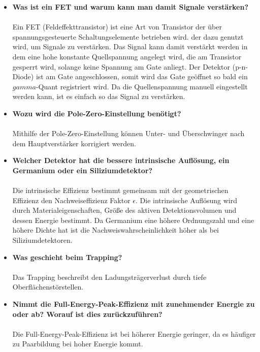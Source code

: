\documentclass{article}
\begin{document}
\begin{itemize}
	\item \textbf{Was ist ein FET und warum kann man damit Signale verstärken?}\\\\
	Ein FET (Feldeffekttransistor) ist eine Art von Transistor der über spannungsgesteuerte Schaltungselemente betrieben wird. der dazu genutzt wird, um Signale zu verstärken. Das Signal kann damit verstärkt werden in dem eine hohe konstante Quellspannung angelegt wird, die am Transistor gesperrt wird, solange keine Spannung am Gate anliegt. Der Detektor (p-n-Diode) ist am Gate angeschlossen, somit wird das Gate geöffnet so bald ein $gamma$-Quant registriert wird. Da die Quellenspannung manuell eingestellt werden kann, ist es einfach so das Signal zu verstärken.
	\item \textbf{Wozu wird die Pole-Zero-Einstellung benötigt?}\\\\
	Mithilfe der Pole-Zero-Einstellung können Unter- und Überschwinger nach dem Hauptverstärker korrigiert werden.
	\item \textbf{Welcher Detektor hat die bessere intrinsische Auflösung, ein Germanium oder ein Siliziumdetektor?}\\\\
	Die intrinsische Effizienz bestimmt gemeinsam mit der geometrischen Effizienz den Nachweiseffizienz Faktor $\epsilon$. Die intrinsische Auflösung wird durch Materialeigenschaften, Größe des aktiven Detektionsvolumen und dessen Energie bestimmt. Da Germanium eine höhere Ordnungszahl und eine höhere Dichte hat ist die Nachweiswahrscheinlichkeit höher als bei Siliziumdetektoren.
	\item \textbf{Was geschieht beim Trapping?}\\\\
	Das Trapping beschreibt den Ladungsträgerverlust durch tiefe Oberflächenstörstellen.
	\item \textbf{Nimmt die Full-Energy-Peak-Effizienz mit zunehmender Energie zu oder ab? Worauf ist dies zurückzuführen?}\\\\
	Die Full-Energy-Peak-Effizienz ist bei höherer Energie geringer, da es häufiger zu Paarbildung bei hoher Energie kommt.
	
	\end{itemize}
\end{document}
